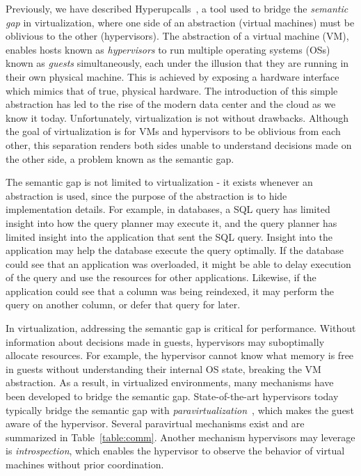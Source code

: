 \documentclass[11pt]{article}
\begin{document}
Previously, we have described Hyperupcalls~\cite{amit2018design}, a tool used to bridge the \emph{semantic gap} in virtualization,
where one side of an abstraction (virtual machines) must be oblivious to the other (hypervisors). The abstraction of a virtual machine (VM), enables
hosts known as \emph{hypervisors} to run multiple operating systems (OSs) known as \emph{guests} simultaneously, 
each under the illusion that they are running in their own physical machine. This is achieved
by exposing a hardware interface which mimics that of true, physical hardware. 
The introduction of this simple abstraction has led to the rise of the modern data center and the cloud as we know it today. Unfortunately,
virtualization is not without drawbacks. Although the goal of virtualization is for VMs and hypervisors to be oblivious from each other, this separation renders both sides unable to understand
decisions made on the other side, a problem known as the semantic gap. 

The semantic gap is not limited to virtualization - it exists whenever an abstraction is used, since the purpose of
the abstraction is to hide implementation details. For example, in databases, a SQL query has limited insight into how
the query planner may execute it, and the query planner has limited insight into the application that sent the SQL
query. Insight into the application may help the database execute the query optimally. If the database 
could see that an application was overloaded, it might be able to delay execution of the query and use the resources
for other applications. Likewise, if the application could see that a column was being reindexed, it may perform
the query on another column, or defer that query for later. 

In virtualization, addressing the semantic gap is critical for performance. Without information about  
decisions made in guests, hypervisors may suboptimally allocate resources. For example,
the hypervisor cannot know what memory is free in guests without understanding their
internal OS state, breaking the VM abstraction. As a result, in virtualized environments, many
mechanisms have been developed to bridge the semantic gap.
State-of-the-art hypervisors today typically bridge the semantic gap
with \emph{paravirtualization}~\cite{barham03,russell08virtio}, 
which makes the guest aware of the hypervisor. Several paravirtual mechanisms exist 
and are summarized in Table~\ref{table:comm}. Another mechanism hypervisors may
leverage is \emph{introspection}, which enables the hypervisor to observe the behavior of
virtual machines without prior coordination. 
\end{document}
